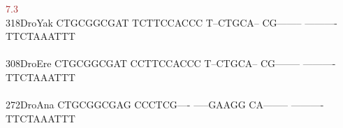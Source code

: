 \documentclass[11pt,twoside,reqno,a4paper]{article}
\begin{document}
{\hspace*{4\charwidth}\hspace*{7\charwidth}\hspace*{1\charwidth}\hspace*{1\charwidth}\hspace*{1\charwidth}\hspace*{1\charwidth}\hspace*{1\charwidth}\hspace*{55\charwidth}\textcolor{Brown}{7.3}\hspace*{1\charwidth}\\
318\hspace*{1\charwidth}DroYak	CTGCGGCGAT	TCTTCCACCC	T--CTGCA--	CG--------	----------	TTCTAAATTT	\\
\hspace*{4\charwidth}\hspace*{7\charwidth}\hspace*{1\charwidth}\hspace*{1\charwidth}\hspace*{1\charwidth}\hspace*{1\charwidth}\hspace*{1\charwidth}\hspace*{1\charwidth}\\
308\hspace*{1\charwidth}DroEre	CTGCGGCGAT	CCTTCCACCC	T--CTGCA--	CG--------	----------	TTCTAAATTT	\\
\hspace*{4\charwidth}\hspace*{7\charwidth}\hspace*{1\charwidth}\hspace*{1\charwidth}\hspace*{1\charwidth}\hspace*{1\charwidth}\hspace*{1\charwidth}\hspace*{1\charwidth}\\
272\hspace*{1\charwidth}DroAna	CTGCGGCGAG	CCCTCG----	-----GAAGG	CA--------	----------	TTCTAAATTT	\\
\hspace*{4\charwidth}\hspace*{7\charwidth}\hspace*{1\charwidth}\hspace*{1\charwidth}\hspace*{1\charwidth}\hspace*{1\charwidth}\hspace*{1\charwidth}\hspace*{1\charwidth}\\
}
\end{document}
